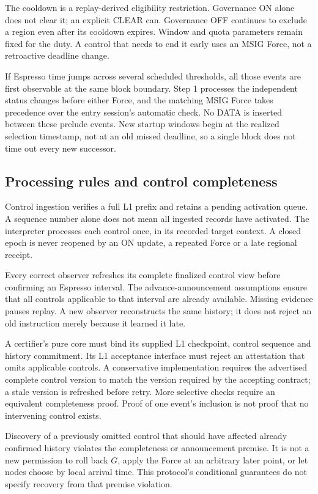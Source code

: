 \documentclass[11pt,a4paper]{article}
\newcounter{protocol}
\begin{document}
The cooldown is a replay-derived eligibility restriction. Governance ON
alone does not clear it; an explicit CLEAR can. Governance OFF continues
to exclude a region even after its cooldown expires.
Window and quota parameters remain fixed for the duty. A control that
needs to end it early uses an MSIG Force, not a retroactive deadline
change.

If Espresso time jumps across several scheduled thresholds, all those
events are first observable at the same block boundary. Step 1 processes
the independent status changes before either Force, and the matching
MSIG Force takes precedence over the entry session's automatic check.
No DATA is inserted between these prelude events. New startup windows
begin at the realized selection timestamp, not at an old missed
deadline, so a single block does not time out every new successor.

\subsection{Processing rules and control completeness}
\label{sec:control-completeness}
Control ingestion verifies a full L1 prefix and retains a pending
activation queue. A sequence number alone does not mean all ingested
records have activated. The interpreter processes each control once,
in its recorded target context. A closed epoch is never reopened by
an ON update, a repeated Force or a late regional receipt.

Every correct observer refreshes its complete finalized control view
before confirming an Espresso interval. The advance-announcement
assumptions ensure that all controls applicable to that interval are
already available. Missing evidence pauses replay. A new observer
reconstructs the same history; it does not reject an old instruction
merely because it learned it late.

A certifier's pure core must bind its supplied L1 checkpoint, control
sequence and history commitment. Its L1 acceptance interface must
reject an attestation that omits applicable controls. A conservative
implementation requires the advertised complete control version to
match the version required by the accepting contract; a stale version
is refreshed before retry. More selective checks require an equivalent
completeness proof. Proof of one event's inclusion is not proof that
no intervening control exists.

Discovery of a previously omitted control that should have affected
already confirmed history violates the completeness or announcement
premise. It is not a new permission to roll back $G$, apply the Force
at an arbitrary later point, or let nodes choose by local arrival time.
This protocol's conditional guarantees do not specify recovery from
that premise violation.
\end{document}
